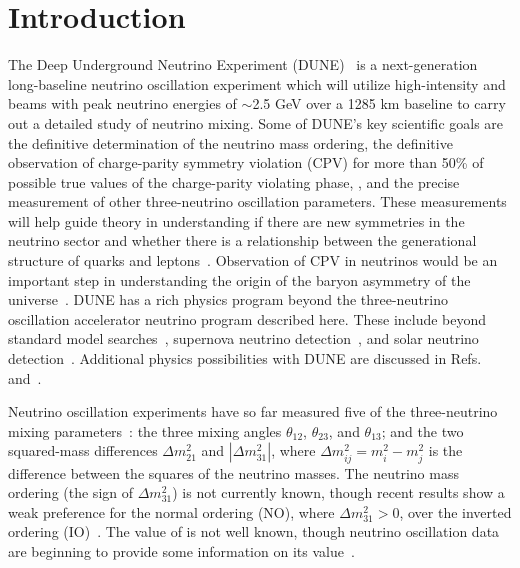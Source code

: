 \section{Introduction}
\label{sec:intro}

The Deep Underground Neutrino Experiment (DUNE)~\cite{Abi:2020wmh} is a next-generation long-baseline neutrino oscillation experiment which will utilize high-intensity \numu and \anumu beams with peak neutrino energies of $\sim$2.5 GeV over a 1285 km baseline to carry out a detailed study of neutrino mixing. Some of DUNE's key scientific goals are the definitive determination of the neutrino mass ordering, the definitive observation of charge-parity symmetry violation (CPV) for more than 50\% of possible true values of the charge-parity violating phase, \deltacp, and the precise measurement of other three-neutrino oscillation parameters.
These measurements will help guide theory in understanding if there are new symmetries in the neutrino sector and whether there is a relationship between the generational structure of quarks and leptons~\cite{Qian:2015waa}. Observation of CPV in neutrinos would be an important step in understanding the origin of the baryon asymmetry of the universe~\cite{Fukugita:1986hr, Davidson:2008bu}. DUNE has a rich physics program beyond the three-neutrino oscillation accelerator neutrino program described here. These include beyond standard model searches~\cite{Abi:2020kei}, supernova neutrino detection~\cite{Abi:2020lpk}, and solar neutrino detection~\cite{Capozzi:2018dat}. Additional physics possibilities with DUNE are discussed in Refs.~\cite{Abi:2020evt} and~\cite{AbedAbud:2021hpb}.

Neutrino oscillation experiments have so far measured five of the three-neutrino mixing parameters~\cite{Capozzi:2017ipn,deSalas:2020pgw,Esteban:2020cvm}: the three mixing angles $\theta_{12}$, $\theta_{23}$, and $\theta_{13}$; and the two squared-mass differences $\Delta m^{2}_{21}$ and $|\Delta m^{2}_{31}|$, where $\Delta m^2_{ij} = m^2_{i} - m^{2}_{j}$ is the difference between the squares of the neutrino masses.
The neutrino mass ordering (the sign of $\Delta m^{2}_{31}$) is not currently known, though recent results show a weak preference for the normal ordering (NO), where $\Delta m^{2}_{31} > 0$, over the inverted ordering (IO)~\cite{Abe:2021gky,PhysRevD.97.072001,PhysRevLett.123.151803}.
The value of \deltacp is not well known, though neutrino oscillation data are beginning to provide some information on its value~\cite{Abe:2019vii,Abe:2021gky}.


